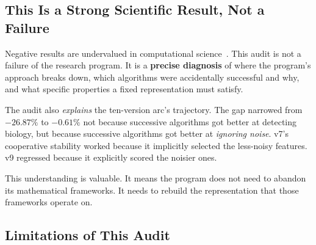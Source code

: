 \documentclass{../yalumba}
\begin{document}
\subsection{This Is a Strong Scientific Result, Not a Failure}
\label{sec:not-failure}

Negative results are undervalued in computational
science~\cite{bendavid2006stability}.  This audit is not a failure of
the research program.  It is a \textbf{precise diagnosis} of where the
program's approach breaks down, which algorithms were accidentally
successful and why, and what specific properties a fixed representation
must satisfy.

The audit also \emph{explains} the ten-version arc's trajectory.
The gap narrowed from $-26.87\%$ to $-0.61\%$ not because successive
algorithms got better at detecting biology, but because successive
algorithms got better at \emph{ignoring noise}.  v7's cooperative
stability worked because it implicitly selected the less-noisy
features.  v9 regressed because it explicitly scored the noisier ones.

This understanding is valuable.  It means the program does not need to
abandon its mathematical frameworks.  It needs to rebuild the
representation that those frameworks operate on.

\subsection{Limitations of This Audit}
\label{sec:limitations}
\end{document}

